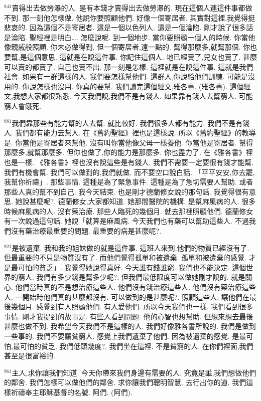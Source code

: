 \documentclass{book}
\begin{document}
$^{841}$賣得出去做勞瀑的人.
是有本錢才賣得出去做勞瀑的.
現在這個人連這件事都做不到.
那一刻他怎樣做.
他說你要照顧他們.
好像一個寄居者.
其實對這裡,我覺得挺悲哀的.
因為這個不是寄居者.
這是一個以色列人.
這是一個淪陷.
剛才說了很多話是淪陷.
聖經裡是明白….
怎麼說呢.
到一個地步.
當你要照顧一個人的時候.
你當他像親戚般照顧.
你未必做得到.
但一個寄居者,遠一點的.
幫得那麼多,就幫那個.
你也要幫,是這個意思.
這就是在說這件事.
你記住這個人.
地已經賣了,兒女也賣了.
甚麼可以賣的都賣了.
自己也賣不出.
那一刻是怎樣.
這裡就是在說這件事.
這就是我們社會.
如果有一群這樣的人.
我們要怎樣幫他們.
這群人,你說給他們訓練.
可能是沒用的.
你說怎樣也沒用.
你真的要幫.
我們讀完這個經文,雅各書.
(雅各書).
這個經文,我想大家都很熟悉.
今天我們說,我們不是有錢人.
如果靠有錢人去幫窮人.
可能窮人會餓死.

$^{881}$我們靠那些有能力幫的人去幫.
就比較好.
我們很多人都有能力.
我們不是有錢人.
我們都有能力去幫人.
在《舊約聖經》裡也是這樣說.
所以《舊約聖經》的教導是.
你當他是寄居者來幫他.
沒有叫你當他像父母一樣養他.
你當他是寄居者.
幫得那麼多,就幫那麼多.
但你也做了,你的能力是那麼多.
你也盡力了.
在《雅各書》裡也是一樣.
《雅各書》裡也沒有說這些是有錢人.
我們不需要一定要很有錢才能幫.
我們有機會幫.
我們可以做到的,我們就做.
而不要空口說白話.
「平平安安,你去罷,我幫你祈禱」.
那些事情.
這種是為了緊急事件.
這種是為了急切需要人幫助.
或者那些人真的幫不到自己.
我今天結束.
也是剛才德蘭修女說的那句話.
我覺得很有意思.
她說甚麼呢?.
德蘭修女,大家都知道.
她那間醫院的機構.
是幫麻風病的人.
很多時候麻風病的人.
沒有藥治療.
那些人臨死的幾個月.
就去那裡照顧他們.
德蘭修女有一次說過這句話.
她說「就算是麻風病.
今天我們也有藥可以幫助這些人.
不過我們沒有藥治療最重要的問題.
最重要的病是甚麼呢?.

$^{921}$是被遺棄.
我和我的姐妹做的就是這件事.
這班人來到,他們的物質已經沒有了.
但最重要的不只是物質沒有了.
而他們覺得孤單和被遺棄.
孤單和被遺棄的感覺.
才是最可怕的貧乏」.
我覺得她說得真好.
今天誰有錢誰窮.
我們也不能決定.
這個世界的窮人.
我們有多少錢是幫多少呢?.
但我們最低限度可以做她剛才說的.
就是關心.
他們當時真的不是想治療這些人.
他們沒有錢治療這些人.
他們沒有藥治療這些人.
一開始時他們真的甚麼都沒有.
可以做到的是甚麼呢?.
照顧這些人.
讓他們在最後幾個月.
感覺到有人照顧他們.
有人愛他們.
所以今天我們也一樣.
我們看到很多事情.
剛才我提到的故事是.
有些人看到問題.
他的心智也想幫助.
但想來想去最後甚麼也做不到.
我希望今天我們不是這樣的人.
我們好像雅各書所說的.
我們是做到一些事的.
我們不要讓貧窮人.
感覺上我們遺棄了他們.
因為被遺棄的感覺.
是最可怕,最可怕的貧乏.
我們低頭幾度?.
我們坐在這裡.
不是貧窮的人.
在你們裡面,我們甚至是很富裕的.

$^{961}$主人,求你讓我們知道.
今天你帶來我們身邊有需要的人.
究竟是誰,我們想做他們的鄰舍.
我們怎樣可以做他們的鄰舍.
求你讓我們聰明智慧.
去行出你的道.
我們這樣祈禱奉主耶穌基督的名號.
阿們.
(阿們).
\newpage
\end{document}
